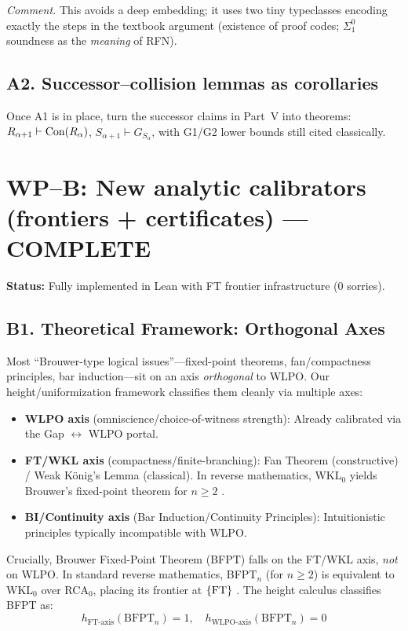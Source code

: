 \documentclass[11pt]{article}
\theoremstyle{definition}
\theoremstyle{remark}
\begin{document}
\emph{Comment.} This avoids a deep embedding; it uses two tiny typeclasses encoding exactly the steps in the textbook argument (existence of proof codes; $\Sigma^0_1$ soundness as the \emph{meaning} of RFN).

\subsection{A2. Successor–collision lemmas as corollaries}
Once A1 is in place, turn the successor claims in Part~V into theorems: 
\(
R_{\alpha+1}\vdash \mathrm{Con}(R_\alpha)\), 
\(S_{\alpha+1}\vdash G_{S_\alpha}\),
with G1/G2 lower bounds still cited classically.

\section{WP–B: New analytic calibrators (frontiers + certificates) — \textbf{\color{green}COMPLETE}}

\textbf{Status:} Fully implemented in Lean with FT frontier infrastructure (0 sorries).

\subsection{B1. Theoretical Framework: Orthogonal Axes}

Most ``Brouwer-type logical issues''—fixed-point theorems, fan/compactness principles, bar induction—sit on an axis \emph{orthogonal} to WLPO. Our height/uniformization framework classifies them cleanly via multiple axes:

\begin{itemize}
\item \textbf{WLPO axis} (omniscience/choice-of-witness strength): Already calibrated via the Gap $\leftrightarrow$ WLPO portal.
\item \textbf{FT/WKL axis} (compactness/finite-branching): Fan Theorem (constructive) / Weak König's Lemma (classical). In reverse mathematics, WKL$_0$ yields Brouwer's fixed-point theorem for $n \geq 2$ \cite{Hirst-BFPT}.
\item \textbf{BI/Continuity axis} (Bar Induction/Continuity Principles): Intuitionistic principles typically incompatible with WLPO.
\end{itemize}

Crucially, Brouwer Fixed-Point Theorem (BFPT) falls on the FT/WKL axis, \emph{not} on WLPO. In standard reverse mathematics, BFPT$_n$ (for $n \geq 2$) is equivalent to WKL$_0$ over RCA$_0$, placing its frontier at $\{\mathrm{FT}\}$ \cite{Shioji-Tanaka}. The height calculus classifies BFPT as:
\[h_{\text{FT-axis}}(\text{BFPT}_n) = 1, \quad h_{\text{WLPO-axis}}(\text{BFPT}_n) = 0\]
\end{document}
